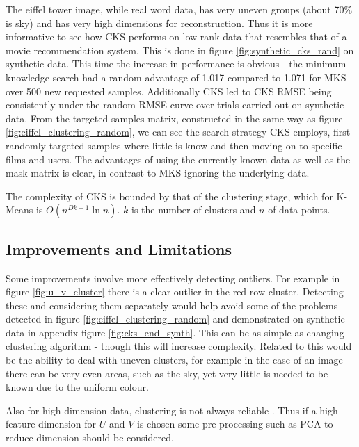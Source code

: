 The eiffel tower image, while real word data, has very uneven groups (about 70\% is sky) and has very high dimensions for reconstruction. Thus it is more informative to see how CKS performs on low rank data that resembles that of a movie recommendation system. This is done in figure \ref{fig:synthetic_cks_rand} on synthetic data. This time the increase in performance is obvious - the minimum knowledge search had a random advantage of 1.017 compared to 1.071 for MKS over 500 new requested samples. Additionally CKS led to CKS RMSE being consistently under the random RMSE curve over trials carried out on synthetic data. From the targeted samples matrix, constructed in the same way as figure \ref{fig:eiffel_clustering_random}, we can see the search strategy CKS employs, first randomly targeted samples where little is know and then moving on to specific films and users. The advantages of using the currently known data as well as the mask matrix is clear, in contrast to MKS ignoring the underlying data.


The complexity of CKS is bounded by that of the clustering stage, which for K-Means is $O(n^{Dk+1} \ln n)$. $k$ is the number of clusters and $n$ of data-points.

\subsection{Improvements and Limitations}
Some improvements involve more effectively detecting outliers. For example in figure \ref{fig:u_v_cluster} there is a clear outlier in the red row cluster. Detecting these and considering them separately would help avoid some of the problems detected in figure \ref{fig:eiffel_clustering_random} and demonstrated on synthetic data in appendix figure \ref{fig:cks_end_synth}. This can be as simple as changing clustering algorithm - though this will increase complexity. Related to this would be the ability to deal with uneven clusters, for example in the case of an image there can be very even areas, such as the sky, yet very little is needed to be known due to the uniform colour.

Also for high dimension data, clustering is not always reliable \cite{highdim-clust}. Thus if a high feature dimension for $U$ and $V$ is chosen some pre-processing such as PCA to reduce dimension should be considered.

